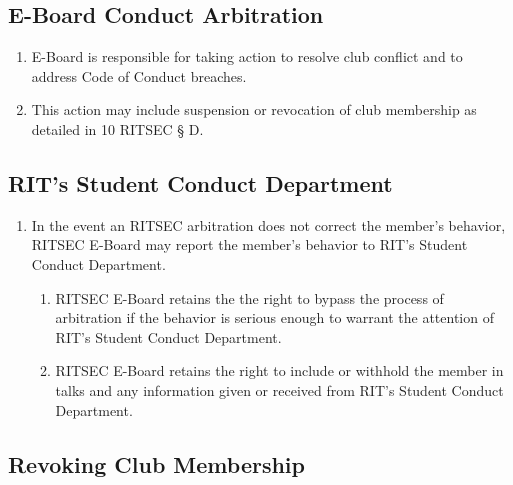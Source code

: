 \subsection{E-Board Conduct Arbitration}

\begin{enumerate}
  \item E-Board is responsible for taking action to resolve club conflict and
    to address Code of Conduct breaches.
  \item This action may include suspension or revocation of club membership as
    detailed in 10 RITSEC § D.
\end{enumerate}

\subsection{RIT's Student Conduct Department}

\begin{enumerate}
  \item In the event an RITSEC arbitration does not correct the member’s
    behavior, RITSEC E-Board may report the member’s behavior to RIT’s Student
    Conduct Department. 
  \begin{enumerate}
    \item RITSEC E-Board retains the the right to bypass the process of
      arbitration if the behavior is serious enough to warrant the attention of
      RIT’s Student Conduct Department.
    \item RITSEC E-Board retains the right to include or withhold the member in
      talks and any information given or received from RIT’s Student Conduct
      Department.
  \end{enumerate}
\end{enumerate}

\subsection{Revoking Club Membership}

